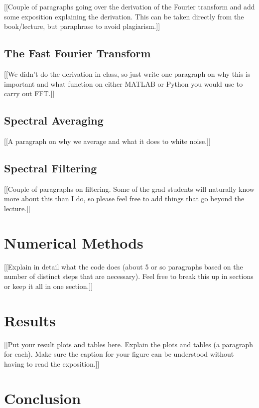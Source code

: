 \documentclass[12pt]{article}%
\begin{document}
{\color{red}[[Couple of paragraphs going over the derivation of the Fourier transform and add some exposition explaining the derivation.  This can be taken directly from the book/lecture, but paraphrase to avoid plagiarism.]]}


\subsection{The Fast Fourier Transform}

{\color{red}[[We didn't do the derivation in class, so just write one paragraph on why this is important and what function on either MATLAB or Python you would use to carry out FFT.]]}


\subsection{Spectral Averaging}

{\color{red}[[A paragraph on why we average and what it does to white noise.]]}


\subsection{Spectral Filtering}

{\color{red}[[Couple of paragraphs on filtering.  Some of the grad students will naturally know more about this than I do, so please feel free to add things that go beyond the lecture.]]}


\section{Numerical Methods}

{\color{red}[[Explain in detail what the code does (about 5 or so paragraphs based on the number of distinct steps that are necessary).   Feel free to break this up in sections or keep it all in one section.]]}


\section{Results}

{\color{red}[[Put your result plots and tables here.  Explain the plots and tables (a paragraph for each).  Make sure the caption for your figure can be understood without having to read the exposition.]]}


\section{Conclusion}\label{Sec: Conclusion}
\end{document}
